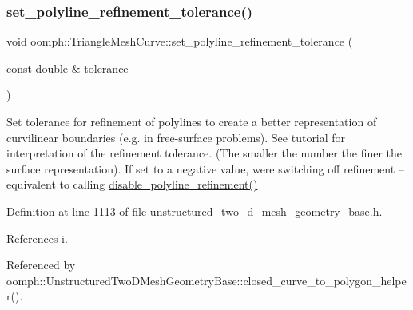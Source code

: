 \mbox{\label{classoomph_1_1TriangleMeshCurve_a161683c0c65fa9be9495f1b22a7a2500}} 
\subsubsection{\texorpdfstring{set\+\_\+polyline\+\_\+refinement\+\_\+tolerance()}{set\_polyline\_refinement\_tolerance()}}
{\footnotesize\ttfamily void oomph\+::\+Triangle\+Mesh\+Curve\+::set\+\_\+polyline\+\_\+refinement\+\_\+tolerance (\begin{DoxyParamCaption}\item[{const double \&}]{tolerance }\end{DoxyParamCaption})\hspace{0.3cm}{\ttfamily [inline]}}



Set tolerance for refinement of polylines to create a better representation of curvilinear boundaries (e.\+g. in free-\/surface problems). See tutorial for interpretation of the refinement tolerance. (The smaller the number the finer the surface representation). If set to a negative value, we\textquotesingle{}re switching off refinement -- equivalent to calling \hyperlink{classoomph_1_1TriangleMeshCurve_a840a3a0c871907660d4ebe571cf36960}{disable\+\_\+polyline\+\_\+refinement()} 



Definition at line 1113 of file unstructured\+\_\+two\+\_\+d\+\_\+mesh\+\_\+geometry\+\_\+base.\+h.



References i.



Referenced by oomph\+::\+Unstructured\+Two\+D\+Mesh\+Geometry\+Base\+::closed\+\_\+curve\+\_\+to\+\_\+polygon\+\_\+helper().

\mbox{\label{classoomph_1_1TriangleMeshCurve_a2174126b383c657bf7c7bc24028844bd}} 
